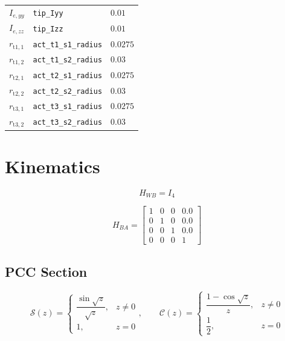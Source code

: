 \documentclass[11pt]{article}
\newcommand{\Sfun}{\mathcal{S}}
\newcommand{\Cfun}{\mathcal{C}}
\begin{document}
\begin{longtable}{lll}
$I_{e,yy}$ & \texttt{tip\_Iyy} & $0.01$ \\
$I_{e,zz}$ & \texttt{tip\_Izz} & $0.01$ \\
$r_{\mathrm{t1},1}$ & \texttt{act\_t1\_s1\_radius} & $0.0275$ \\
$r_{\mathrm{t1},2}$ & \texttt{act\_t1\_s2\_radius} & $0.03$ \\
$r_{\mathrm{t2},1}$ & \texttt{act\_t2\_s1\_radius} & $0.0275$ \\
$r_{\mathrm{t2},2}$ & \texttt{act\_t2\_s2\_radius} & $0.03$ \\
$r_{\mathrm{t3},1}$ & \texttt{act\_t3\_s1\_radius} & $0.0275$ \\
$r_{\mathrm{t3},2}$ & \texttt{act\_t3\_s2\_radius} & $0.03$ \\
\hline
\end{longtable}

\section{Kinematics}
\begin{equation}
H_{WB}=I_4
\end{equation}

\begin{equation}
H_{BA}=\begin{bmatrix}1 & 0 & 0 & 0.0\\0 & 1 & 0 & 0.0\\0 & 0 & 1 & 0.0\\0 & 0 & 0 & 1\end{bmatrix}\label{eq:mount-transform}
\end{equation}

\subsection{PCC Section}
\begin{equation}
\Sfun(z)=\begin{cases}\dfrac{\sin\sqrt z}{\sqrt z},&z\ne0\\1,&z=0\end{cases},\qquad \Cfun(z)=\begin{cases}\dfrac{1-\cos\sqrt z}{z},&z\ne0\\\dfrac12,&z=0\end{cases}
\end{equation}
\end{document}
